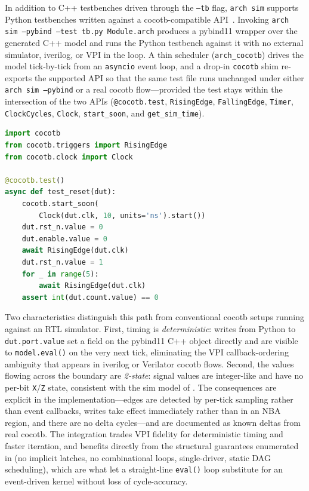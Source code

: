 \documentclass[11pt,twocolumn]{article}
\begin{document}
In addition to C++ testbenches driven through the \texttt{--tb} flag, \texttt{arch sim} supports Python testbenches written against a cocotb-compatible API~\cite{cocotb}. Invoking \texttt{arch sim --pybind --test tb.py Module.arch} produces a pybind11 wrapper over the generated C++ model and runs the Python testbench against it with no external simulator, iverilog, or VPI in the loop. A thin scheduler (\texttt{arch\_cocotb}) drives the model tick-by-tick from an \texttt{asyncio} event loop, and a drop-in \texttt{cocotb} shim re-exports the supported API so that the same test file runs unchanged under either \texttt{arch sim --pybind} or a real cocotb flow---provided the test stays within the intersection of the two APIs (\texttt{@cocotb.test}, \texttt{RisingEdge}, \texttt{FallingEdge}, \texttt{Timer}, \texttt{ClockCycles}, \texttt{Clock}, \texttt{start\_soon}, and \texttt{get\_sim\_time}).

\begin{lstlisting}[language=Python,caption={Python testbench against \texttt{arch sim}},label={lst:cocotbtb}]
import cocotb
from cocotb.triggers import RisingEdge
from cocotb.clock import Clock

@cocotb.test()
async def test_reset(dut):
    cocotb.start_soon(
        Clock(dut.clk, 10, units='ns').start())
    dut.rst_n.value = 0
    dut.enable.value = 0
    await RisingEdge(dut.clk)
    dut.rst_n.value = 1
    for _ in range(5):
        await RisingEdge(dut.clk)
    assert int(dut.count.value) == 0
\end{lstlisting}

Two characteristics distinguish this path from conventional cocotb setups running against an RTL simulator. First, timing is \emph{deterministic}: writes from Python to \texttt{dut.port.value} set a field on the pybind11 C++ object directly and are visible to \texttt{model.eval()} on the very next tick, eliminating the VPI callback-ordering ambiguity that appears in iverilog or Verilator cocotb flows. Second, the values flowing across the boundary are \emph{2-state}: signal values are integer-like and have no per-bit \texttt{X}/\texttt{Z} state, consistent with the sim model of . The consequences are explicit in the implementation---edges are detected by per-tick sampling rather than event callbacks, writes take effect immediately rather than in an NBA region, and there are no delta cycles---and are documented as known deltas from real cocotb. The integration trades VPI fidelity for deterministic timing and faster iteration, and benefits directly from the structural guarantees enumerated in  (no implicit latches, no combinational loops, single-driver, static DAG scheduling), which are what let a straight-line \texttt{eval()} loop substitute for an event-driven kernel without loss of cycle-accuracy.
\end{document}
